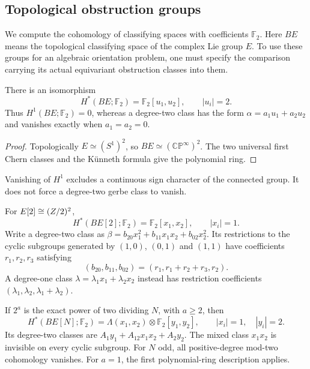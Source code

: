 \subsection{Topological obstruction groups}

We compute the cohomology of classifying spaces with coefficients
$\mathbb F_2$.  Here $BE$ means the topological classifying space of
the complex Lie group $E$.  To use these groups for an algebraic
orientation problem, one must specify the comparison carrying its
actual equivariant obstruction classes into them.

\begin{lemma}
\label{lem:connected-e-descent}
There is an isomorphism
\[
H^*(BE;\mathbb F_2)=\mathbb F_2[u_1,u_2],\qquad |u_i|=2.
\]
Thus $H^1(BE;\mathbb F_2)=0$, whereas a degree-two class has the
form $\alpha=a_1u_1+a_2u_2$ and vanishes exactly when $a_1=a_2=0$.
\end{lemma}

\begin{proof}
Topologically $E\simeq(S^1)^2$, so
$BE\simeq(\mathbb{CP}^{\infty})^2$.  The two universal first Chern
classes and the K\"unneth formula give the polynomial ring.
\end{proof}

Vanishing of $H^1$ excludes a continuous sign character of the
connected group.  It does not force a degree-two gerbe class to vanish.

\begin{lemma}
\label{lem:finite-stabilizer-e-descent}
For $E[2]\cong(Z/2)^2$,
\[
H^*(BE[2];\mathbb F_2)=\mathbb F_2[x_1,x_2],\qquad |x_i|=1.
\]
Write a degree-two class as
$\beta=b_{20}x_1^2+b_{11}x_1x_2+b_{02}x_2^2$.
Its restrictions to the cyclic subgroups generated by $(1,0)$,
$(0,1)$ and $(1,1)$ have coefficients $r_1,r_2,r_3$ satisfying
\[
(b_{20},b_{11},b_{02})=(r_1,r_1+r_2+r_3,r_2).
\]
A degree-one class $\lambda=\lambda_1x_1+\lambda_2x_2$ instead has
restriction coefficients $(\lambda_1,\lambda_2,\lambda_1+\lambda_2)$.

If $2^a$ is the exact power of two dividing $N$, with $a\ge2$, then
\[
H^*(BE[N];\mathbb F_2)
=\Lambda(x_1,x_2)\otimes\mathbb F_2[y_1,y_2],
\qquad |x_i|=1,\quad |y_i|=2.
\]
Its degree-two classes are
$A_1y_1+A_{12}x_1x_2+A_2y_2$.
The mixed class $x_1x_2$ is invisible on every cyclic subgroup.
For $N$ odd, all positive-degree mod-two cohomology vanishes.
For $a=1$, the first polynomial-ring description applies.
\end{lemma}

